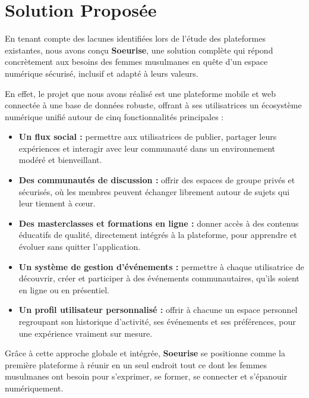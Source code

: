 \documentclass[12pt,a4paper]{report}
\begin{document}
	\section{Solution Proposée}
	
	En tenant compte des lacunes identifiées lors de l'étude des plateformes existantes, 
	nous avons conçu \textbf{Soeurise}, une solution complète qui répond concrètement 
	aux besoins des femmes musulmanes en quête d'un espace numérique sécurisé, inclusif 
	et adapté à leurs valeurs.
	
	En effet, le projet que nous avons réalisé est une plateforme mobile et web connectée 
	à une base de données robuste, offrant à ses utilisatrices un écosystème numérique 
	unifié autour de cinq fonctionnalités principales :
	
	\begin{itemize}
		\item \textbf{Un flux social :} permettre aux utilisatrices de publier, partager 
		leurs expériences et interagir avec leur communauté dans un environnement modéré 
		et bienveillant.
		
		\item \textbf{Des communautés de discussion :} offrir des espaces de groupe privés 
		et sécurisés, où les membres peuvent échanger librement autour de sujets qui leur 
		tiennent à cœur.
		
		\item \textbf{Des masterclasses et formations en ligne :} donner accès à des 
		contenus éducatifs de qualité, directement intégrés à la plateforme, pour apprendre 
		et évoluer sans quitter l'application.
		
		\item \textbf{Un système de gestion d'événements :} permettre à chaque utilisatrice 
		de découvrir, créer et participer à des événements communautaires, qu'ils soient 
		en ligne ou en présentiel.
		
		\item \textbf{Un profil utilisateur personnalisé :} offrir à chacune un espace 
		personnel regroupant son historique d'activité, ses événements et ses préférences, 
		pour une expérience vraiment sur mesure.
	\end{itemize}
	
	\medskip
	
	Grâce à cette approche globale et intégrée, \textbf{Soeurise} se positionne comme 
	la première plateforme à réunir en un seul endroit tout ce dont les femmes musulmanes 
	ont besoin pour s'exprimer, se former, se connecter et s'épanouir numériquement.
	
\end{document}
